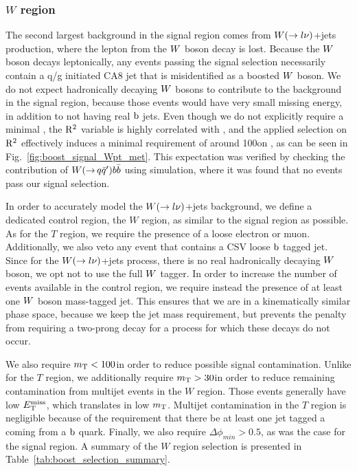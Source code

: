 

\subsubsection{\texorpdfstring{$W$}{W} region}

The second largest background in the signal region comes from $W(\rightarrow l\nu)$+jets
production, where the lepton from the $W$ boson decay is lost.
Because the $W$ boson decays leptonically, any events passing the signal selection necessarily
contain a q/g initiated CA8 jet that is misidentified as a boosted $W$ boson. 
We do not expect hadronically decaying $W$ bosons to contribute to the background in the signal
region, because those events would have very small missing energy, in addition to not having real
$\mathrm{b}$ jets. Even though we do not explicitly require a minimal \ETm, the $\mathrm{R^2}$ variable is highly
correlated with \ETm, and the applied selection on $\mathrm{R^2}$ effectively induces a minimal
requirement of around 100\GeV on \ETm, as can be seen in Fig.~\ref{fig:boost_signal_Wpt_met}. 
This expectation was verified by checking the contribution of $W({\rightarrow}\,
q\bar{q}')b\bar{b}$ using simulation, where it was found that no events pass our signal
selection. 

In order to accurately model the $W(\rightarrow l\nu)$+jets background, we define a dedicated
control region, the $W$ region, as similar to the signal region as possible. As for the $T$ region,
we require the presence of a loose electron or muon. Additionally, we also veto any event that
contains a CSV loose $\mathrm{b}$ tagged jet.  
Since for the $W(\rightarrow l\nu)$+jets process, there is no real hadronically decaying $W$
boson, we opt not to use the full $W$ tagger. 
In order to increase the number of events available in the control region, we require instead the
presence of at least one $W$ boson mass-tagged jet. This ensures that we are in a kinematically
similar phase space, because we keep the jet mass requirement, but prevents the penalty from
requiring a two-prong decay for a process for which these decays do not occur. 

We also require $m_{\mathrm{T}} < 100$\GeV in order to reduce possible signal contamination. Unlike for the $T$
region, we additionally require $m_{\mathrm{T}} > 30$\GeV in order to reduce remaining contamination from
multijet events in the $W$ region. Those events generally have low $E_{\mathrm{T}}^{\text{miss}}$, which translates in low
$m_{\mathrm{T}}$. 
Multijet contamination in the $T$ region is negligible because of the
requirement that there be at least one jet tagged a coming from a $\mathrm{b}$ quark. 
Finally, we also require $\Delta\phi_{min} > 0.5$, as was the case for the signal region. 
A summary of the $W$ region selection is presented in Table~\ref{tab:boost_selection_summary}.

